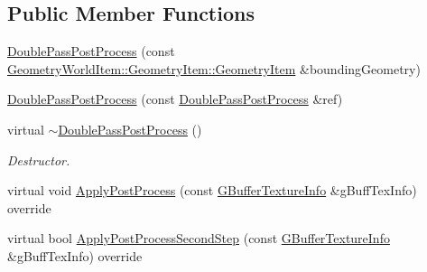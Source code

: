 \subsection*{Public Member Functions}
\begin{DoxyCompactItemize}
\item 
\mbox{\hyperlink{class_geometry_engine_1_1_geometry_post_process_1_1_double_pass_post_process_1_1_double_pass_post_process_aacc7fc7eca98dbfa500035cbacbea78b}{Double\+Pass\+Post\+Process}} (const \mbox{\hyperlink{class_geometry_engine_1_1_geometry_world_item_1_1_geometry_item_1_1_geometry_item}{Geometry\+World\+Item\+::\+Geometry\+Item\+::\+Geometry\+Item}} \&bounding\+Geometry)
\item 
\mbox{\hyperlink{class_geometry_engine_1_1_geometry_post_process_1_1_double_pass_post_process_1_1_double_pass_post_process_acf262889c6fddc54ee4daf2015c2a69f}{Double\+Pass\+Post\+Process}} (const \mbox{\hyperlink{class_geometry_engine_1_1_geometry_post_process_1_1_double_pass_post_process_1_1_double_pass_post_process}{Double\+Pass\+Post\+Process}} \&ref)
\item 
\mbox{\label{class_geometry_engine_1_1_geometry_post_process_1_1_double_pass_post_process_1_1_double_pass_post_process_ae50b64dabbe90930bffb4976785021ed}} 
virtual \mbox{\hyperlink{class_geometry_engine_1_1_geometry_post_process_1_1_double_pass_post_process_1_1_double_pass_post_process_ae50b64dabbe90930bffb4976785021ed}{$\sim$\+Double\+Pass\+Post\+Process}} ()
\begin{DoxyCompactList}\small\item\em Destructor. \end{DoxyCompactList}\item 
virtual void \mbox{\hyperlink{class_geometry_engine_1_1_geometry_post_process_1_1_double_pass_post_process_1_1_double_pass_post_process_a9d2674bc5b237ed2e494d1c88f63d29e}{Apply\+Post\+Process}} (const \mbox{\hyperlink{struct_geometry_engine_1_1_g_buffer_texture_info}{G\+Buffer\+Texture\+Info}} \&g\+Buff\+Tex\+Info) override
\item 
virtual bool \mbox{\hyperlink{class_geometry_engine_1_1_geometry_post_process_1_1_double_pass_post_process_1_1_double_pass_post_process_a1caac8d2ec6f65de1bb98edd88ba14c6}{Apply\+Post\+Process\+Second\+Step}} (const \mbox{\hyperlink{struct_geometry_engine_1_1_g_buffer_texture_info}{G\+Buffer\+Texture\+Info}} \&g\+Buff\+Tex\+Info) override
\end{DoxyCompactItemize}
